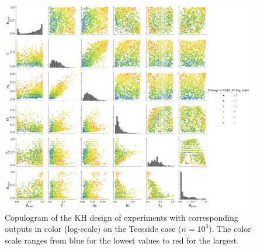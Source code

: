 \begin{figure}[!h]
\begin{center}
    \includegraphics[width=\textwidth]{part2/figures/DCE/teesside/kh_output_pairplot.jpg}
\end{center}
\caption{Copulogram of the KH design of experiments with corresponding outputs in color (log-scale) on the Teesside case ($n = 10^3$). 
The color scale ranges from blue for the lowest values to red for the largest.} \label{fig:pairplot_kh_teesside}
\end{figure}

